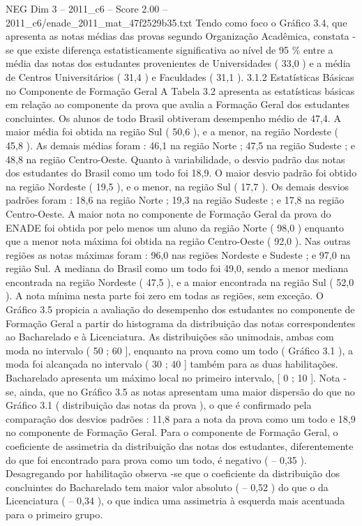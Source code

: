 \begin{textsample}{NEG Dim 3 – 2011\_c6 – Score 2.00 – 2011\_c6/enade\_2011\_mat\_47f2529b35.txt}
Tendo como foco o Gráfico 3.4, que apresenta as notas médias das provas segundo Organização Acadêmica, constata -se que existe diferença estatisticamente significativa ao nível de 95 \% entre a média das notas dos estudantes provenientes de Universidades ( 33,0 ) e a média de Centros Universitários ( 31,4 ) e Faculdades ( 31,1 ). 3.1.2 Estatísticas Básicas no Componente de Formação Geral A Tabela 3.2 apresenta as estatísticas básicas em relação ao componente da prova que avalia a Formação Geral dos estudantes concluintes.
Os alunos de todo Brasil obtiveram desempenho médio de 47,4.
A maior média foi obtida na região Sul ( 50,6 ), e a menor, na região Nordeste ( 45,8 ).
As demais médias foram : 46,1 na região Norte ; 47,5 na região Sudeste ; e 48,8 na região Centro-Oeste.
Quanto à variabilidade, o desvio padrão das notas dos estudantes do Brasil como um todo foi 18,9.
O maior desvio padrão foi obtido na região Nordeste ( 19,5 ), e o menor, na região Sul ( 17,7 ).
Os demais desvios padrões foram : 18,6 na região Norte ; 19,3 na região Sudeste ; e 17,8 na região Centro-Oeste.
A maior nota no componente de Formação Geral da prova do ENADE foi obtida por pelo menos um aluno da região Norte ( 98,0 ) enquanto que a menor nota máxima foi obtida na região Centro-Oeste ( 92,0 ).
Nas outras regiões as notas máximas foram : 96,0 nas regiões Nordeste e Sudeste ; e 97,0 na região Sul.
A mediana do Brasil como um todo foi 49,0, sendo a menor mediana encontrada na região Nordeste ( 47,5 ), e a maior encontrada na região Sul ( 52,0 ).
A nota mínima nesta parte foi zero em todas as regiões, sem exceção.
O Gráfico 3.5 propicia a avaliação do desempenho dos estudantes no componente de Formação Geral a partir do histograma da distribuição das notas correspondentes ao Bacharelado e à Licenciatura.
As distribuições são unimodais, ambas com moda no intervalo ( 50 ; 60 ], enquanto na prova como um todo ( Gráfico 3.1 ), a moda foi alcançada no intervalo ( 30 ; 40 ] também para as duas habilitações.
Bacharelado apresenta um máximo local no primeiro intervalo, [ 0 ; 10 ].
Nota -se, ainda, que no Gráfico 3.5 as notas apresentam uma maior dispersão do que no Gráfico 3.1 ( distribuição das notas da prova ), o que é confirmado pela comparação dos desvios padrões : 11,8 para a nota da prova como um todo e 18,9 no componente de Formação Geral.
Para o componente de Formação Geral, o coeficiente de assimetria da distribuição das notas dos estudantes, diferentemente do que foi encontrado para prova como um todo, é negativo ( – 0,35 ).
Desagregando por habilitação observa -se que o coeficiente da distribuição dos concluintes do Bacharelado tem maior valor absoluto ( – 0,52 ) do que o da Licenciatura ( – 0,34 ), o que indica uma assimetria à esquerda mais acentuada para o primeiro grupo.

\end{textsample}
